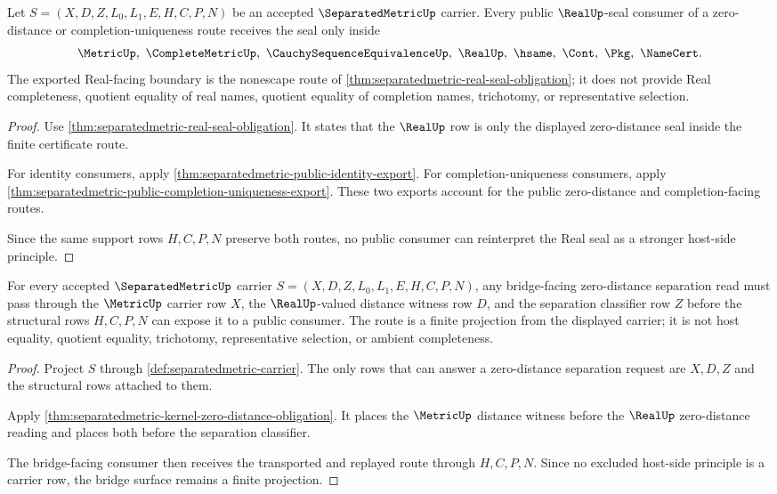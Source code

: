 \begin{theorem}
\label{thm:separatedmetric-public-real-seal-nonescape-export}
Let $S=(X,D,Z,L_0,L_1,E,H,C,P,N)$ be an accepted $\SeparatedMetricUp$ carrier. Every public $\RealUp$-seal consumer of a zero-distance or completion-uniqueness route receives the seal only inside
$$
\MetricUp,\ \CompleteMetricUp,\ \CauchySequenceEquivalenceUp,\ \RealUp,\ \hsame,\ \Cont,\ \Pkg,\ \NameCert .
$$
The exported Real-facing boundary is the nonescape route of \autoref{thm:separatedmetric-real-seal-obligation}; it does not provide Real completeness, quotient equality of real names, quotient equality of completion names, trichotomy, or representative selection.
\end{theorem}
\begin{proof}
Use \autoref{thm:separatedmetric-real-seal-obligation}. It states that the $\RealUp$ row is only the displayed zero-distance seal inside the finite certificate route.

For identity consumers, apply \autoref{thm:separatedmetric-public-identity-export}. For completion-uniqueness consumers, apply \autoref{thm:separatedmetric-public-completion-uniqueness-export}. These two exports account for the public zero-distance and completion-facing routes.

Since the same support rows $H,C,P,N$ preserve both routes, no public consumer can reinterpret the Real seal as a stronger host-side principle.
\end{proof}

\begin{theorem}
\label{thm:separatedmetric-zero-distance-separation-obligation}
For every accepted $\SeparatedMetricUp$ carrier $S=(X,D,Z,L_0,L_1,E,H,C,P,N)$, any bridge-facing zero-distance separation read must pass through the $\MetricUp$ carrier row $X$, the $\RealUp$-valued distance witness row $D$, and the separation classifier row $Z$ before the structural rows $H,C,P,N$ can expose it to a public consumer. The route is a finite projection from the displayed carrier; it is not host equality, quotient equality, trichotomy, representative selection, or ambient completeness.
\end{theorem}
\begin{proof}
Project $S$ through \autoref{def:separatedmetric-carrier}. The only rows that can answer a zero-distance separation request are $X,D,Z$ and the structural rows attached to them.

Apply \autoref{thm:separatedmetric-kernel-zero-distance-obligation}. It places the $\MetricUp$ distance witness before the $\RealUp$ zero-distance reading and places both before the separation classifier.

The bridge-facing consumer then receives the transported and replayed route through $H,C,P,N$. Since no excluded host-side principle is a carrier row, the bridge surface remains a finite projection.
\end{proof}

